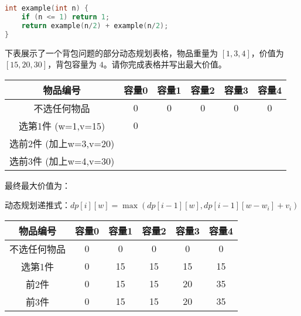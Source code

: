 \documentclass[12pt,answers]{zjutexam}
\begin{document}
\begin{questions}
\begin{lstlisting}[language=C]
int example(int n) {
    if (n <= 1) return 1;
    return example(n/2) + example(n/2);
}
\end{lstlisting}

\question[5] 下表展示了一个背包问题的部分动态规划表格，物品重量为 $[1, 3, 4]$，价值为 $[15, 20, 30]$，背包容量为 $4$。请你完成表格并写出最大价值。

\begin{center}
\renewcommand{\arraystretch}{1.2}
\begin{tabular}{|c|c|c|c|c|c|}
\hline
物品编号 & 容量0 & 容量1 & 容量2 & 容量3 & 容量4 \\
\hline
不选任何物品 & 0 & 0 & 0 & 0 & 0 \\
\hline
选第1件 (w=1,v=15) & 0 & \underline{\hspace{1.2cm}} & \underline{\hspace{1.2cm}} & \underline{\hspace{1.2cm}} & \underline{\hspace{1.2cm}} \\
\hline
选前2件 (加上w=3,v=20) & \underline{\hspace{1.2cm}} & \underline{\hspace{1.2cm}} & \underline{\hspace{1.2cm}} & \underline{\hspace{1.2cm}} & \underline{\hspace{1.2cm}} \\
\hline
选前3件 (加上w=4,v=30) & \underline{\hspace{1.2cm}} & \underline{\hspace{1.2cm}} & \underline{\hspace{1.2cm}} & \underline{\hspace{1.2cm}} & \underline{\hspace{1.2cm}} \\
\hline
\end{tabular}
\end{center}

\vspace{0.5em}
最终最大价值为：\underline{\hspace{3cm}} 
\begin{solution}
动态规划递推式：$dp[i][w] = \max(dp[i-1][w], dp[i-1][w-w_i]+v_i)$

\begin{center}
\begin{tabular}{|c|c|c|c|c|c|}
\hline
物品编号 & 容量0 & 容量1 & 容量2 & 容量3 & 容量4 \\
\hline
不选任何物品 & 0 & 0 & 0 & 0 & 0 \\
\hline
选第1件 & 0 & 15 & 15 & 15 & 15 \\
\hline
前2件 & 0 & 15 & 15 & 20 & 35 \\
\hline
前3件 & 0 & 15 & 15 & 20 & 35 \\
\hline
\end{tabular}
\end{center}


\end{solution}
\end{questions}
\end{document}
